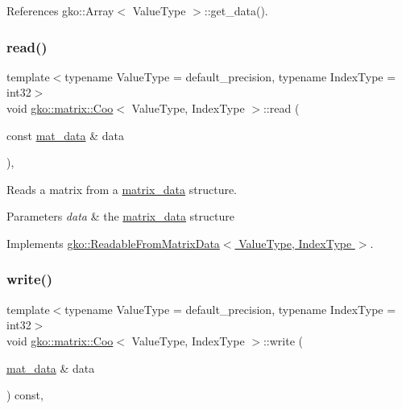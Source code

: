 References gko\+::\+Array$<$ Value\+Type $>$\+::get\+\_\+data().

\mbox{\label{classgko_1_1matrix_1_1Coo_ac0d4aeb19d9f55b62bea18bad1a408f5}} 
\subsubsection{\texorpdfstring{read()}{read()}}
{\footnotesize\ttfamily template$<$typename Value\+Type = default\+\_\+precision, typename Index\+Type = int32$>$ \\
void \hyperlink{classgko_1_1matrix_1_1Coo}{gko\+::matrix\+::\+Coo}$<$ Value\+Type, Index\+Type $>$\+::read (\begin{DoxyParamCaption}\item[{const \hyperlink{structgko_1_1matrix__data}{mat\+\_\+data} \&}]{data }\end{DoxyParamCaption})\hspace{0.3cm}{\ttfamily [override]}, {\ttfamily [virtual]}}



Reads a matrix from a \hyperlink{structgko_1_1matrix__data}{matrix\+\_\+data} structure. 


\begin{DoxyParams}{Parameters}
{\em data} & the \hyperlink{structgko_1_1matrix__data}{matrix\+\_\+data} structure \\
\hline
\end{DoxyParams}


Implements \hyperlink{classgko_1_1ReadableFromMatrixData_add5c12e23b3ac3c8fbd607fa5a9656bb}{gko\+::\+Readable\+From\+Matrix\+Data$<$ Value\+Type, Index\+Type $>$}.

\mbox{\label{classgko_1_1matrix_1_1Coo_ae193466ca1a4a3c7d1383ddc5a2701ab}} 
\subsubsection{\texorpdfstring{write()}{write()}}
{\footnotesize\ttfamily template$<$typename Value\+Type = default\+\_\+precision, typename Index\+Type = int32$>$ \\
void \hyperlink{classgko_1_1matrix_1_1Coo}{gko\+::matrix\+::\+Coo}$<$ Value\+Type, Index\+Type $>$\+::write (\begin{DoxyParamCaption}\item[{\hyperlink{structgko_1_1matrix__data}{mat\+\_\+data} \&}]{data }\end{DoxyParamCaption}) const\hspace{0.3cm}{\ttfamily [override]}, {\ttfamily [virtual]}}



